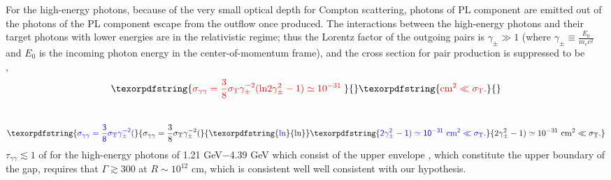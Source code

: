 \documentclass[prd,twocolumn,amsmath,amssymb,aps,linenumbers]{revtex4-2} %
\providecommand{\DIFaddtex}[1]{{\protect\color{blue} \sf #1}} %
\providecommand{\DIFdeltex}[1]{{\protect\color{red} \scriptsize #1}} %
\providecommand{\DIFaddbegin}{} %
\providecommand{\DIFaddend}{} %
\providecommand{\DIFdelbegin}{} %
\providecommand{\DIFdelend}{} %
\providecommand{\DIFadd}[1]{\texorpdfstring{\DIFaddtex{#1}}{#1}} %
\providecommand{\DIFdel}[1]{\texorpdfstring{\DIFdeltex{#1}}{}} %
\newcommand{\DIFscaledelfig}{0.5}
\newlength{\DIFdelgraphicswidth} %
\newlength{\DIFdelgraphicsheight} %
\newcommand{\DIFaddincludegraphics}[2][]{{\color{blue}\fbox{\DIFOincludegraphics[#1]{#2}}}} %
\newcommand{\DIFdelincludegraphics}[2][]{%
\sbox{\DIFdelgraphicsbox}{\DIFOincludegraphics[#1]{#2}}%
\settoboxwidth{\DIFdelgraphicswidth}{\DIFdelgraphicsbox} %
\settoboxtotalheight{\DIFdelgraphicsheight}{\DIFdelgraphicsbox} %
\scalebox{\DIFscaledelfig}{%
\parbox[b]{\DIFdelgraphicswidth}{\usebox{\DIFdelgraphicsbox}\\[-\baselineskip] \rule{\DIFdelgraphicswidth}{0em}}\llap{\resizebox{\DIFdelgraphicswidth}{\DIFdelgraphicsheight}{%
\setlength{\unitlength}{\DIFdelgraphicswidth}%
\begin{picture}(1,1)%
\thicklines\linethickness{2pt} %
{\color[rgb]{1,0,0}\put(0,0){\framebox(1,1){}}}%
{\color[rgb]{1,0,0}\put(0,0){\line( 1,1){1}}}%
{\color[rgb]{1,0,0}\put(0,1){\line(1,-1){1}}}%
\end{picture}%
}\hspace*{3pt}}} %
} %
\DeclareRobustCommand{\DIFaddbegin}{\DIFOaddbegin \let\includegraphics\DIFaddincludegraphics} %
\DeclareRobustCommand{\DIFaddend}{\DIFOaddend \let\includegraphics\DIFOincludegraphics} %
\DeclareRobustCommand{\DIFdelbegin}{\DIFOdelbegin \let\includegraphics\DIFdelincludegraphics} %
\DeclareRobustCommand{\DIFdelend}{\DIFOaddend \let\includegraphics\DIFOincludegraphics} %
\begin{document}
 For the high-energy photons, because of the very small optical depth for Compton scattering, \DIFdelbegin \DIFdel{photons of PL component are emitted out of }\DIFdelend \DIFaddbegin \DIFadd{the photons of the PL component escape from }\DIFaddend the outflow once produced. The interactions between \DIFaddbegin \DIFadd{the }\DIFaddend high-energy photons and their target photons with lower energies are in the relativistic regime; thus the Lorentz factor of the outgoing pairs \DIFaddbegin \DIFadd{is }\DIFaddend $\gamma_{\pm}\gg1$ (where $\gamma_{\pm}\equiv\frac{E_{0}}{m_e c^2}$ and $E_{0}$ is the incoming photon
energy in the center-of-momentum frame), \DIFaddbegin \DIFadd{and }\DIFaddend the cross section for pair production is suppressed to\DIFdelbegin \DIFdel{be ~\mbox{%
\citep{1976tper.book.....J, 2018pgrb.book.....Z}
}\hskip0pt%
,
}\begin{displaymath}
\DIFdel{\sigma_{\gamma\gamma}=\frac{3}{8}\sigma_{\rm T} \gamma_{\pm}^{-2}(\rm{ln}2\gamma_{\pm}^2 -1)\simeq10^{-31} \ }\\\DIFdel{\rm{cm}^{2}\ll \sigma_{\rm T}.
}\end{displaymath}%
\DIFdelend \DIFaddbegin \DIFadd{~\mbox{%
\citep{1976tper.book.....J, 2018pgrb.book.....Z}
}\hskip0pt%
}\begin{equation}
\DIFadd{\sigma_{\gamma\gamma}=\frac{3}{8}\sigma_{\rm T} \gamma_{\pm}^{-2}(}{\DIFadd{\rm ln}}\DIFadd{2\gamma_{\pm}^2 -1)\simeq10^{-31} \ {\rm cm}^{2}\ll \sigma_{\rm T}.
}\end{equation}\DIFaddend 
$\tau_{\gamma\gamma}\lesssim1$ \DIFdelbegin \DIFdel{of }\DIFdelend \DIFaddbegin \DIFadd{for }\DIFaddend the high-energy photons of 1.21 GeV$-$4.39 GeV\DIFdelbegin \DIFdel{which consist of the upper envelope }\DIFdelend \DIFaddbegin \DIFadd{, which constitute the upper boundary }\DIFaddend of the gap, requires \DIFdelbegin \DIFdel{that }\DIFdelend $\Gamma\gtrsim300$ at $R\sim10^{12}$ cm, which is \DIFdelbegin \DIFdel{consistent well }\DIFdelend \DIFaddbegin \DIFadd{well consistent }\DIFaddend with our hypothesis.






\end{document}
